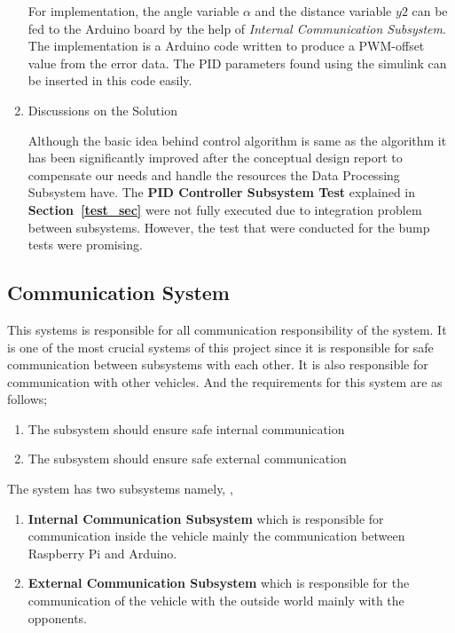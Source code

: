 \documentclass[a4paper,12pt]{article}
\begin{document}
\begin{enumerate}
	For implementation, the angle variable $\alpha$ and the distance variable $y2$ can be fed to the Arduino board by the help of \textit{Internal Communication Subsystem}. The implementation is a Arduino code written to produce a PWM-offset value from the error data. The PID parameters found using the simulink can be inserted in this code easily.
		

				
				\item {Discussions on the Solution}
	
	Although the basic idea behind control algorithm is same as the algorithm it has been significantly improved after the conceptual design report to compensate our needs and handle the resources the Data Processing Subsystem have. The \textbf{PID Controller Subsystem Test} explained in \textbf{Section~\ref{test_sec}} were not fully executed due to integration problem between subsystems.  However, the test that were conducted for the bump tests were promising.	
			
			\end{enumerate}
		
		
			
		
		
			
			
		\subsection{Communication System}
			
		This systems is responsible for all communication responsibility of the system. It is one of the most crucial systems of this project since it is responsible for safe communication between subsystems with each other. It is also responsible for communication with other vehicles.	And the requirements for this system are as follows;		
		
			\begin{enumerate}
				\item The subsystem should ensure safe internal communication
				\item The subsystem should ensure safe external communication
			\end{enumerate}	
		
		
		The system has two subsystems namely, 	,
		
			\begin{enumerate}
				\item \textbf{Internal Communication Subsystem} which is responsible for communication inside the vehicle mainly the communication between Raspberry Pi and Arduino.						
				\item \textbf{External Communication Subsystem} which is responsible for the communication of the vehicle with the outside world mainly with the opponents.
			\end{enumerate}		
			
\end{document}
